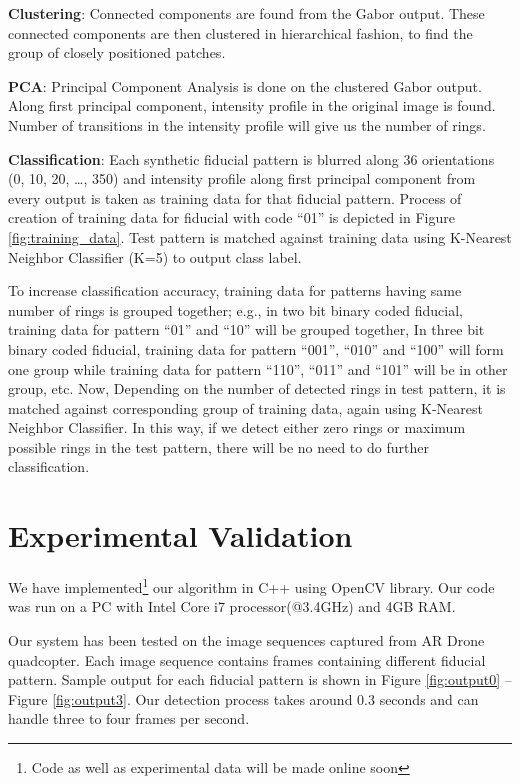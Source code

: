 \documentclass[runningheads]{llncs}
\begin{document}
\textbf{Clustering}: Connected components are found from the Gabor output.
These connected components are then clustered in hierarchical fashion, to find
the group of closely positioned patches.

\textbf{PCA}: Principal Component Analysis is done on the clustered Gabor
output. Along first principal component, intensity profile in the original image
is found. Number of transitions in the intensity profile will give us the
number of rings.

\textbf{Classification}: Each synthetic fiducial pattern is blurred along 36
orientations (0, 10, 20, \ldots , 350) and intensity profile along first
principal component from every output is taken as training data for that
fiducial pattern. Process of creation of training data for fiducial with
code ``01'' is depicted in Figure \ref{fig:training_data}. Test pattern is matched
against training data using K-Nearest Neighbor Classifier (K=5) to output class label.

To increase classification accuracy, training data for patterns having same
number of rings is grouped together; e.g., in two bit binary coded fiducial,
training data for pattern ``01'' and ``10'' will be grouped together, In three
bit binary coded fiducial, training data for pattern “001”, “010” and “100” will
form one group while training data for pattern “110”, “011” and “101” will be
in other group, etc. Now, Depending on the number of detected rings in test
pattern, it is matched against corresponding group of training data, again
using  K-Nearest Neighbor Classifier. In this way, if we detect either zero
rings or maximum possible rings in the test pattern, there will be no need to do
further classification.

\section{Experimental Validation}
We have implemented\footnote{Code as well as experimental data will be made
online soon} our algorithm in C++ using OpenCV library.
Our code was run on a PC with Intel Core i7 processor(@3.4GHz) and 4GB RAM.

Our system has been tested on the image sequences captured from AR Drone
quadcopter. Each image sequence contains frames containing different fiducial
pattern. Sample output for each fiducial pattern is shown in Figure
\ref{fig:output0} -- Figure \ref{fig:output3}. Our detection process takes
around 0.3 seconds and can handle three to four frames per second.
\end{document}
